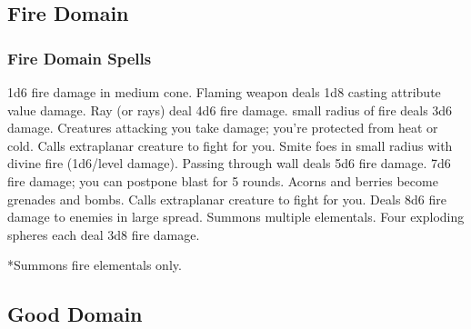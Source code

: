 \subsection{Fire Domain}

\subsubsection{Fire Domain Spells}
\begin{spelllist}
 1d6 fire damage in medium cone.
\spellhead[1]{}
 Flaming weapon deals 1d8 \add casting attribute value damage.
 Ray (or rays) deal 4d6 fire damage.
\spellhead[3]{}
 small radius of fire deals 3d6 damage.
 Creatures attacking you take damage; you're protected from heat or cold.
 Calls extraplanar creature to fight for you.
 Smite foes in small radius with divine fire (1d6/level damage).
 Passing through wall deals 5d6 fire damage.
 7d6 fire damage; you can postpone blast for 5 rounds.
 Acorns and berries become grenades and bombs.
\spellhead[7]{}
 Calls extraplanar creature to fight for you.
 Deals 8d6 fire damage to enemies in large spread.
 Summons multiple elementals.
 Four exploding spheres each deal 3d8 fire damage.
\end{spelllist}
*Summons fire elementals only.

\subsection{Good Domain}
